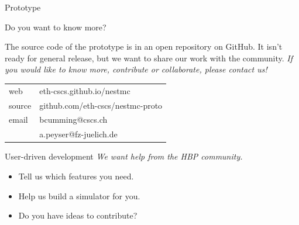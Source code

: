 \documentclass[a0paper,portrait]{baposter}
\newcommand{\newemph}[1]{{\color{blue!40!black}\em #1}}
\begin{document}
\begin{poster}
\begin{posterbox}[name=nestmc,column=0,below=who,span=2]{Prototype}
\end{posterbox}

\begin{posterbox}[name=nestmc,column=0,below=nestmc,span=2]{Do you want to know more?}
\hfill
    \begin{minipage}{0.45\textwidth}

        The source code of the prototype is in an open repository on GitHub.
        It isn't ready for general release, but we want to share our work with the community.
        \newemph{If you would like to know more, contribute or collaborate, please contact us!}
    \end{minipage}
\hfill
    \begin{minipage}{0.5\textwidth}
        \colorbox[HTML]{FCF3CF}{%
            \begin{tabularx}{0.95\textwidth}{l|X}
                web   & {eth-cscs.github.io/nestmc}\smallskip\\
                source& {github.com/eth-cscs/nestmc-proto}\smallskip\\
                email & {bcumming@cscs.ch}\\
                      & {a.peyser@fz-juelich.de}\smallskip\\
            \end{tabularx}
        }
    \end{minipage}
\hfill

\end{posterbox}


\begin{posterbox}
    [name=help,column=2,row=0,span=1,borderColor=blue!40!black,headerColorOne=blue!40!black,headerFontColor=white]
    {User-driven development}
          \newemph{We want help from the HBP community.}
          \vspace{-2pt}

        \begin{itemize}%
            \item Tell us which features you need.
            \item Help us build a simulator for you.
            \item Do you have ideas to contribute?
        \end{itemize}
        \vspace{-3pt}
\end{posterbox}


\end{poster}
\end{document}
